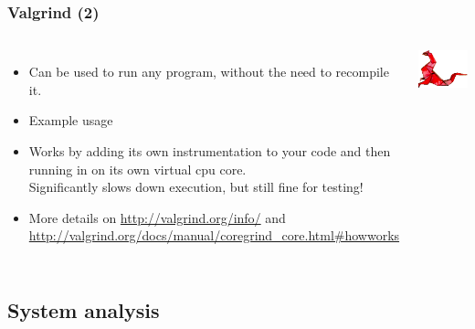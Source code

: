 \begin{frame}
  \frametitle{Valgrind (2)}
  \begin{columns}[T]
    \begin{itemize}
    \item Can be used to run any program, without the need to
      recompile it.
    \item Example usage\\
    \item Works by adding its own instrumentation to your code and
      then running in on its own virtual cpu core.\\
      Significantly slows down execution, but still fine for testing!
    \item More details on \url{http://valgrind.org/info/} and
      \url{http://valgrind.org/docs/manual/coregrind_core.html\#howworks}
    \end{itemize}
    \includegraphics[width=\textwidth]{slides/sysdev-application-development/valgrind2.png}
  \end{columns}
\end{frame}

\subsection{System analysis}



